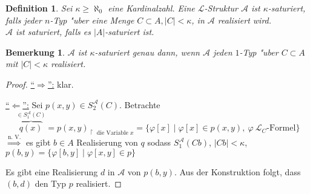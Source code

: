 \documentclass[a4paper,12pt,numbers=noenddot,parskip=full]{scrartcl}
\newcommand{\scrL}{\mathcal{L}}
\newcommand{\scrA}{\mathcal{A}}
\theoremstyle{dotless}
\newtheorem{definition}[theorem]{Definition}
\newtheorem{remark}[theorem]{Bemerkung}
\begin{document}
\begin{definition}
	Sei $\kappa \geq \aleph_0$ eine Kardinalzahl. Eine $\scrL$-Struktur $\scrA$ ist \emph{$\kappa$-saturiert}, falls jeder $n$-Typ "uber eine Menge $C \subset A, |C|<\kappa$, in $\scrA$ realisiert wird.\\
	$\scrA$ ist \emph{saturiert}, falls es $|A|$-saturiert ist.
\end{definition}
\begin{remark}
	$\scrA$ ist $\kappa$-saturiert genau dann, wenn $\scrA$ jeden $1$-Typ "uber $C \subset A$ mit $|C| < \kappa$ realisiert.
\end{remark}
\begin{proof}
	\underline{"`$\Rightarrow$"':} klar.
	
	\underline{"`$\Leftarrow$"':} Sei $p(x,y) \in S_2^\scrA(C)$. Betrachte \begin{equation*}
		\overbrace{q(x)}^{\in S_1^\scrA(C)} = p(x,y)_{\upharpoonright \text{ die Variable }x}=\{\varphi[x] \mid \varphi[x] \in p(x,y),~ \varphi~\scrL_C \text{-Formel} \}
	\end{equation*}
	$\overset{\text{n. V.}}{\Longrightarrow}$ es gibt $b \in A$ Realisierung von $q$ sodass $S_1^\scrA(Cb)$, $|Cb| < \kappa$, $p(b,y) = \{\varphi[b,y] \mid \varphi[x,y] \in p \}$
	
	Es gibt eine Realisierung $d$ in $\scrA$ von $p(b,y)$. Aus der Konstruktion folgt, dass $(b,d)$ den Typ $p$ realisiert.
\end{proof}
\end{document}
